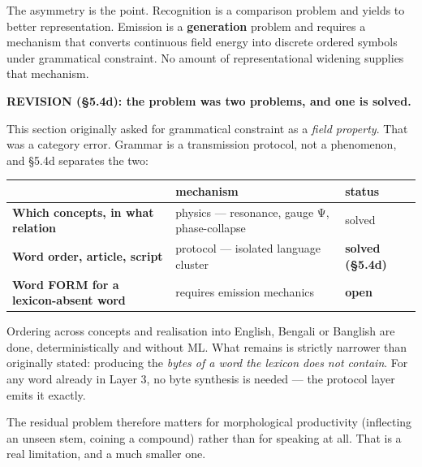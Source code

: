 \documentclass[
  11pt,
  a4paper,
]{article}
\begin{document}
The asymmetry is the point. Recognition is a comparison problem and
yields to better representation. Emission is a \textbf{generation}
problem and requires a mechanism that converts continuous field energy
into discrete ordered symbols under grammatical constraint. No amount of
representational widening supplies that mechanism.

\textbf{REVISION (§5.4d): the problem was two problems, and one is
solved.}

This section originally asked for grammatical constraint as a
\emph{field property}. That was a category error. Grammar is a
transmission protocol, not a phenomenon, and §5.4d separates the two:

\begin{longtable}[]{@{}
  >{\raggedright\arraybackslash}p{}
  >{\raggedright\arraybackslash}p{}
  >{\raggedright\arraybackslash}p{}@{}}
\toprule\noalign{}
\begin{minipage}[b]{\linewidth}\raggedright
\end{minipage} & \begin{minipage}[b]{\linewidth}\raggedright
mechanism
\end{minipage} & \begin{minipage}[b]{\linewidth}\raggedright
status
\end{minipage} \\
\midrule\noalign{}
\endhead
\bottomrule\noalign{}
\endlastfoot
\textbf{Which concepts, in what relation} & physics --- resonance, gauge
Ψ, phase-collapse & solved \\
\textbf{Word order, article, script} & protocol --- isolated language
cluster & \textbf{solved (§5.4d)} \\
\textbf{Word FORM for a lexicon-absent word} & requires emission
mechanics & \textbf{open} \\
\end{longtable}

Ordering across concepts and realisation into English, Bengali or
Banglish are done, deterministically and without ML. What remains is
strictly narrower than originally stated: producing the \emph{bytes of a
word the lexicon does not contain}. For any word already in Layer 3, no
byte synthesis is needed --- the protocol layer emits it exactly.

The residual problem therefore matters for morphological productivity
(inflecting an unseen stem, coining a compound) rather than for speaking
at all. That is a real limitation, and a much smaller one.
\end{document}
